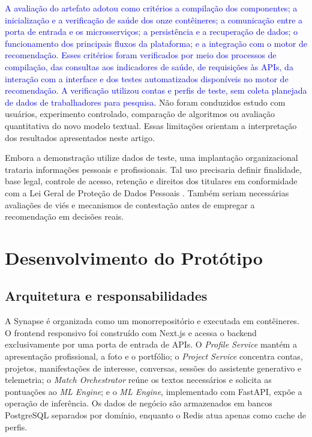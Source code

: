 \documentclass[12pt]{article}
\begin{document}
\textcolor{blue}{A avaliação do artefato adotou como critérios a compilação dos componentes; a inicialização e a verificação de saúde dos onze contêineres; a comunicação entre a porta de entrada e os microsserviços; a persistência e a recuperação de dados; o funcionamento dos principais fluxos da plataforma; e a integração com o motor de recomendação. Esses critérios foram verificados por meio dos processos de compilação, das consultas aos indicadores de saúde, de requisições às APIs, da interação com a interface e dos testes automatizados disponíveis no motor de recomendação. A verificação utilizou contas e perfis de teste, sem coleta planejada de dados de trabalhadores para pesquisa.} Não foram conduzidos estudo com usuários, experimento controlado, comparação de algoritmos ou avaliação quantitativa do novo modelo textual. Essas limitações orientam a interpretação dos resultados apresentados neste artigo.

Embora a demonstração utilize dados de teste, uma implantação organizacional trataria informações pessoais e profissionais. Tal uso precisaria definir finalidade, base legal, controle de acesso, retenção e direitos dos titulares em conformidade com a Lei Geral de Proteção de Dados Pessoais \cite{brasil2018lgpd}. Também seriam necessárias avaliações de viés e mecanismos de contestação antes de empregar a recomendação em decisões reais.

\section{Desenvolvimento do Protótipo}

\subsection{Arquitetura e responsabilidades}

A Synapse é organizada como um monorrepositório e executada em contêineres. O frontend responsivo foi construído com Next.js e acessa o backend exclusivamente por uma porta de entrada de APIs. O \textit{Profile Service} mantém a apresentação profissional, a foto e o portfólio; o \textit{Project Service} concentra contas, projetos, manifestações de interesse, conversas, sessões do assistente generativo e telemetria; o \textit{Match Orchestrator} reúne os textos necessários e solicita as pontuações ao \textit{ML Engine}; e o \textit{ML Engine}, implementado com FastAPI, expõe a operação de inferência. Os dados de negócio são armazenados em bancos PostgreSQL separados por domínio, enquanto o Redis atua apenas como cache de perfis.
\end{document}
